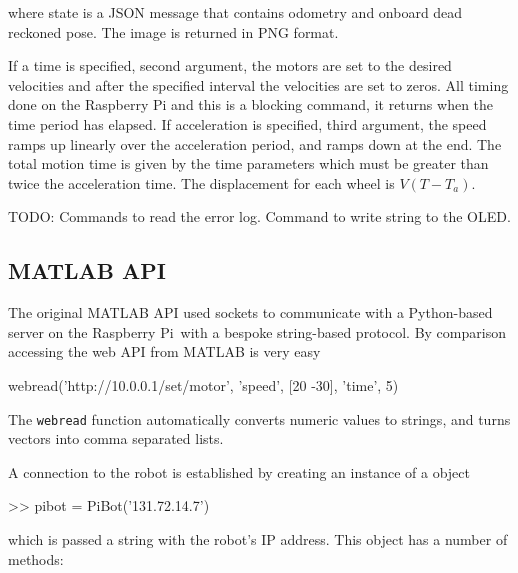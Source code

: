 \documentclass[11pt,fleqn]{article}
\newcommand{\rpi}{Raspberry Pi}
\begin{document}
where state is a JSON message that contains odometry and onboard dead reckoned pose.
The image is returned in PNG format.

If a time is specified, second argument, the motors are set to the desired velocities and after the specified interval the velocities are set to zeros.  All timing done on the Raspberry Pi
and this is a blocking command, it returns when the time period has elapsed.
If acceleration is specified, third argument, the speed ramps up linearly over the acceleration period, and ramps down at the end.  The total motion time is given by the time 
parameters which must be greater than twice the acceleration time.
The displacement for each wheel is $V (T - T_a)$.


TODO: Commands to read the error log.  Command to write string to the OLED.

\subsection{MATLAB API}
The original MATLAB API used sockets to communicate with a Python-based server on the \rpi\ with a bespoke string-based protocol.
By comparison accessing the web API from MATLAB is very easy
\begin{Code}
webread('http://10.0.0.1/set/motor', 'speed', [20 -30], 'time', 5)
\end{Code}
The \texttt{webread} function automatically converts numeric values to strings, and turns vectors into comma separated lists.


A connection to the robot is established by creating an instance of a  object
\begin{Code}
>> pibot = PiBot('131.72.14.7')
\end{Code}
which is passed a string with the robot's IP address.  This object has a number of methods:
\end{document}
